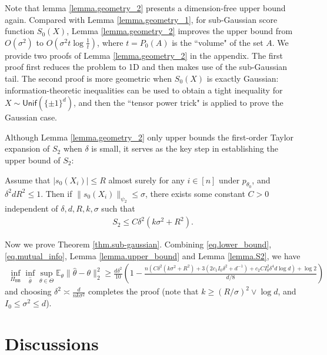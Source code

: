 \documentclass[final,12pt]{colt2018} %
\def \bE {\mathbb{E}}
\begin{document}
Note that lemma \ref{lemma.geometry_2} presents a dimension-free upper bound again. Compared with Lemma \ref{lemma.geometry_1}, for sub-Gaussian score function $S_0(X)$, Lemma \ref{lemma.geometry_2} improves the upper bound from $O(\sigma^2)$ to $O(\sigma^2t\log\frac{1}{t})$, where $t=P_0(A)$ is the ``volume" of the set $A$. We provide two proofs of Lemma \ref{lemma.geometry_2} in the appendix. The first proof first reduces the problem to 1D and then makes use of the sub-Gaussian tail. The second proof is more geometric when $S_0(X)$ is exactly Gaussian: information-theoretic inequalities can be used to obtain a tight inequality for $X\sim \mathsf{Unif}(\{\pm 1\}^d)$, and then the ``tensor power trick" is applied to prove the Gaussian case. 

Although Lemma \ref{lemma.geometry_2} only upper bounds the first-order Taylor expansion of $S_2$ when $\delta$ is small, it serves as the key step in establishing the upper bound of $S_2$:
\begin{lemma}\label{lemma.S2}
	Assume that $|s_0(X_i)|\le R$ almost surely for any $i\in [n]$ under $p_{\theta_0}$, and $\delta^2dR^2\le 1$. Then if $\|s_0(X_i)\|_{\psi_2}\le \sigma$, there exists some constant $C>0$ independent of $\delta,d,R,k,\sigma$ such that
	\begin{align*}
	S_2 \le C\delta^2 \left(k\sigma^2 + R^2\right). 
	\end{align*}
\end{lemma}

Now we prove Theorem \ref{thm.sub-gaussian}. Combining \eqref{eq.lower_bound}, \eqref{eq.mutual_info}, Lemma \ref{lemma.upper_bound} and Lemma \ref{lemma.S2}, we have
\begin{align*}
\inf_{\Pi_{\mathsf{BB}}}\inf_{\hat{\theta}}\sup_{\theta\in\Theta} \bE_\theta\|\hat{\theta}-\theta\|_2^2 \ge \frac{d\delta^2}{10}\left(1-\frac{n(C\delta^2(k\sigma^2+R^2) + 3(2c_1I_0\delta^2 + d^{-1}) + c_2CI_0^2\delta^4d\log d )+\log 2}{d/8}\right)
\end{align*}
and choosing $\delta^2\asymp \frac{d}{nk\sigma^2}$ completes the proof (note that $k\ge (R/\sigma)^2\vee \log d$, and $I_0\le \sigma^2\le d$). 

\section{Discussions}\label{sec.discussion}
\end{document}
